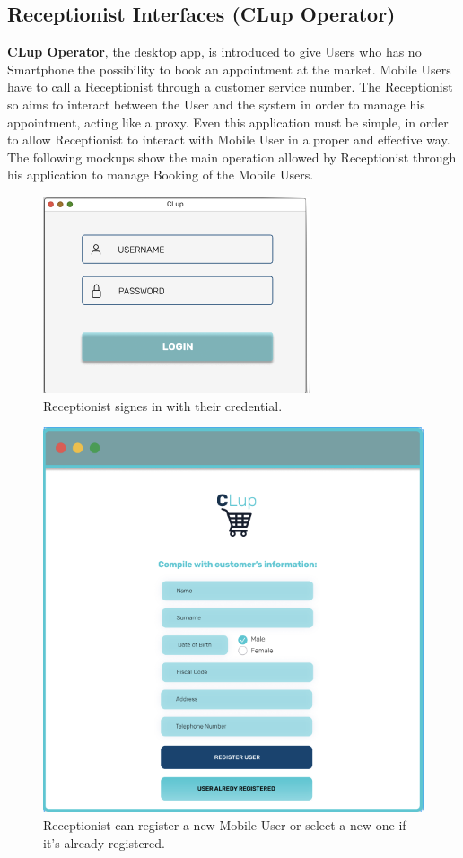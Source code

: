 \subsection{Receptionist Interfaces (CLup Operator)}
\textbf{CLup Operator}, the desktop app, is introduced to give Users who has no Smartphone the possibility to book an appointment at the market. Mobile Users have to call a Receptionist through a customer service number. The Receptionist so aims to interact between the User and the system in order to manage his appointment, acting like a proxy. 
Even this application must be simple, in order to allow Receptionist to interact with Mobile User in a proper and effective way.
The following mockups show the main operation allowed by Receptionist through his application to manage Booking of the Mobile Users.
\begin{figure}[H]
  \caption{Receptionist signes in with their credential.}
  \label{fig:Login}
  \centering
  \includegraphics[scale=0.55]{images/mockup/LOGIN_REC.png}

\end{figure}

\begin{figure}[H]
  \caption{Receptionist can register a new Mobile User or select a new one if it's already registered.}
  \label{fig:Login}
  \centering
  \includegraphics[scale=0.35]{images/mockup/LOGREG.png}

\end{figure}

